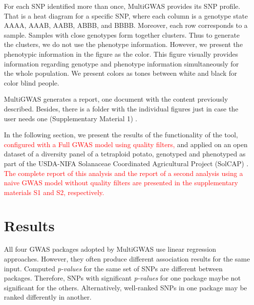 \documentclass{article}
\begin{document}
For each SNP identified more than once, MultiGWAS provides its SNP profile. That is a heat diagram for a specific SNP, where each column is a genotype state AAAA, AAAB, AABB, ABBB, and BBBB. Moreover, each row corresponds to a sample. Samples with close genotypes form together clusters. Thus to generate the clusters, we do not use the phenotype information. However, we present the phenotypic information in the figure as the color. This figure visually provides information regarding genotype and phenotype information simultaneously for the whole population. We present colors as tones between white and black for color blind people.



MultiGWAS generates a report, one document with the content previously described. Besides, there is a folder with the individual figures just in case the user needs one (Supplementary Material 1) .


In the following section, we present the results of the functionality of the tool,\textcolor{red}{{} configured with a Full GWAS model using quality filters,} and applied on an open dataset of a diversity panel of a tetraploid potato, genotyped and phenotyped as part of the USDA-NIFA Solanaceae Coordinated Agricultural Project (SolCAP) \cite{Hirsch2013}. \textcolor{red}{The complete report of this analysis and the report of a second analysis using a naive GWAS model without quality filters are presented in the supplementary materials S1 and S2, respectively.}


\section{Results}

All four GWAS packages adopted by MultiGWAS use linear regression approaches. However, they often produce different association results for the same input. Computed \emph{p-values }for the same set of SNPs are different between packages. Therefore, SNPs with significant \emph{p-values} for one package maybe not significant for the others. Alternatively, well-ranked SNPs in one package may be ranked differently in another. 
\end{document}
